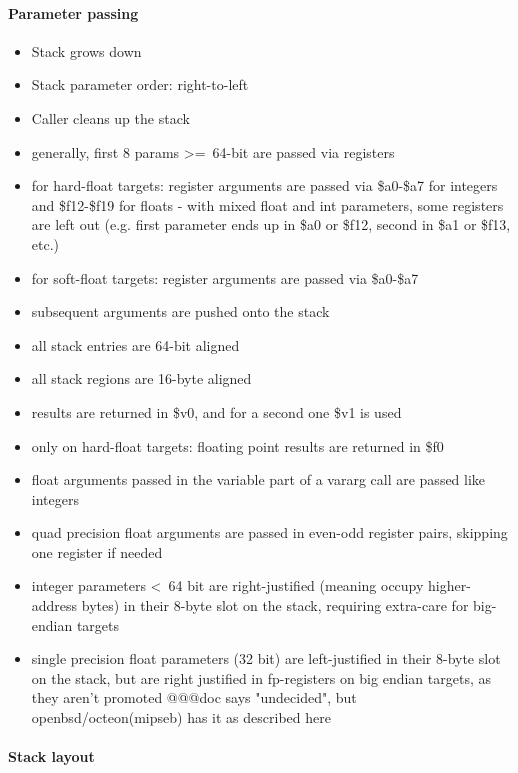\paragraph{Parameter passing}

\begin{itemize}
\item Stack grows down
\item Stack parameter order: right-to-left
\item Caller cleans up the stack
\item generally, first 8 params \textgreater=\ 64-bit are passed via registers
\item for hard-float targets: register arguments are passed via \$a0-\$a7 for integers and \$f12-\$f19 for floats - with mixed float and int parameters, some registers are left out (e.g. first parameter ends up in \$a0 or \$f12, second in \$a1 or \$f13, etc.)
\item for soft-float targets: register arguments are passed via \$a0-\$a7
\item subsequent arguments are pushed onto the stack
\item all stack entries are 64-bit aligned
\item all stack regions are 16-byte aligned
\item results are returned in \$v0, and for a second one \$v1 is used
\item only on hard-float targets: floating point results are returned in \$f0
\item float arguments passed in the variable part of a vararg call are passed like integers
\item quad precision float arguments are passed in even-odd register pairs, skipping one register if needed
\item integer parameters \textless\ 64 bit are right-justified (meaning occupy higher-address bytes) in their 8-byte slot on the stack, requiring extra-care for big-endian targets
\item single precision float parameters (32 bit) are left-justified in their 8-byte slot on the stack, but are right justified in fp-registers on big endian targets, as they aren't promoted @@@doc says "undecided", but openbsd/octeon(mipseb) has it as described here
\end{itemize}

\paragraph{Stack layout}

